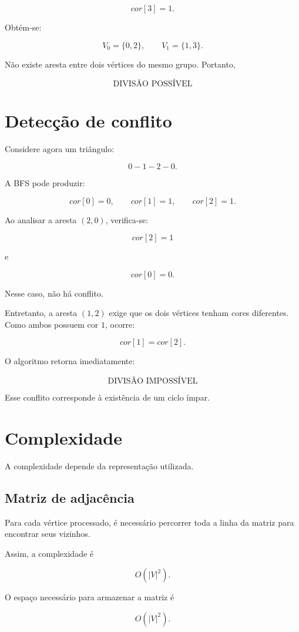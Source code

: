 \documentclass[12pt,a4paper]{article}
\begin{document}
$$
cor[3]=1.
$$

Obtém-se:

$$
V_0=\{0,2\},
\qquad
V_1=\{1,3\}.
$$

Não existe aresta entre dois vértices do mesmo grupo. Portanto,

$$
\boxed{\text{DIVISÃO POSSÍVEL}}
$$

\section{Detecção de conflito}

Considere agora um triângulo:

$$
0-1-2-0.
$$

A BFS pode produzir:

$$
cor[0]=0,
\qquad
cor[1]=1,
\qquad
cor[2]=1.
$$

Ao analisar a aresta $(2,0)$, verifica-se:

$$
cor[2]=1
$$

e

$$
cor[0]=0.
$$

Nesse caso, não há conflito.

Entretanto, a aresta $(1,2)$ exige que os dois vértices tenham cores
diferentes. Como ambos possuem cor $1$, ocorre:

$$
cor[1]=cor[2].
$$

O algoritmo retorna imediatamente:

$$
\boxed{\text{DIVISÃO IMPOSSÍVEL}}
$$

Esse conflito corresponde à existência de um ciclo ímpar.

\section{Complexidade}

A complexidade depende da representação utilizada.

\subsection{Matriz de adjacência}

Para cada vértice processado, é necessário percorrer toda a linha da
matriz para encontrar seus vizinhos.

Assim, a complexidade é

$$
O(|V|^2).
$$

O espaço necessário para armazenar a matriz é

$$
O(|V|^2).
$$
\end{document}
